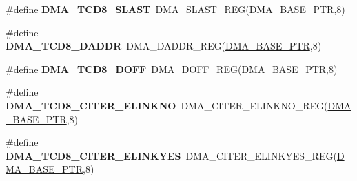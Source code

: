 \begin{DoxyCompactItemize}
\item 
\hypertarget{group___d_m_a___register___accessor___macros_ga3c48604678432613c2255a9ccf1ee23c}{}\#define {\bfseries D\+M\+A\+\_\+\+T\+C\+D8\+\_\+\+S\+L\+A\+S\+T}~D\+M\+A\+\_\+\+S\+L\+A\+S\+T\+\_\+\+R\+E\+G(\hyperlink{group___d_m_a___peripheral_ga6997fbc1b1973e9f27170217a3bd6f22}{D\+M\+A\+\_\+\+B\+A\+S\+E\+\_\+\+P\+T\+R},8)\label{group___d_m_a___register___accessor___macros_ga3c48604678432613c2255a9ccf1ee23c}

\item 
\hypertarget{group___d_m_a___register___accessor___macros_ga6585193ba70d793fa96c368446847218}{}\#define {\bfseries D\+M\+A\+\_\+\+T\+C\+D8\+\_\+\+D\+A\+D\+D\+R}~D\+M\+A\+\_\+\+D\+A\+D\+D\+R\+\_\+\+R\+E\+G(\hyperlink{group___d_m_a___peripheral_ga6997fbc1b1973e9f27170217a3bd6f22}{D\+M\+A\+\_\+\+B\+A\+S\+E\+\_\+\+P\+T\+R},8)\label{group___d_m_a___register___accessor___macros_ga6585193ba70d793fa96c368446847218}

\item 
\hypertarget{group___d_m_a___register___accessor___macros_ga87de01c15f745a0d3fb02b2b0b13764c}{}\#define {\bfseries D\+M\+A\+\_\+\+T\+C\+D8\+\_\+\+D\+O\+F\+F}~D\+M\+A\+\_\+\+D\+O\+F\+F\+\_\+\+R\+E\+G(\hyperlink{group___d_m_a___peripheral_ga6997fbc1b1973e9f27170217a3bd6f22}{D\+M\+A\+\_\+\+B\+A\+S\+E\+\_\+\+P\+T\+R},8)\label{group___d_m_a___register___accessor___macros_ga87de01c15f745a0d3fb02b2b0b13764c}

\item 
\hypertarget{group___d_m_a___register___accessor___macros_ga6da76173da694902dd5e5974ed7f9efd}{}\#define {\bfseries D\+M\+A\+\_\+\+T\+C\+D8\+\_\+\+C\+I\+T\+E\+R\+\_\+\+E\+L\+I\+N\+K\+N\+O}~D\+M\+A\+\_\+\+C\+I\+T\+E\+R\+\_\+\+E\+L\+I\+N\+K\+N\+O\+\_\+\+R\+E\+G(\hyperlink{group___d_m_a___peripheral_ga6997fbc1b1973e9f27170217a3bd6f22}{D\+M\+A\+\_\+\+B\+A\+S\+E\+\_\+\+P\+T\+R},8)\label{group___d_m_a___register___accessor___macros_ga6da76173da694902dd5e5974ed7f9efd}

\item 
\hypertarget{group___d_m_a___register___accessor___macros_gae6a4aaa8869815edf82c900a92bdfe92}{}\#define {\bfseries D\+M\+A\+\_\+\+T\+C\+D8\+\_\+\+C\+I\+T\+E\+R\+\_\+\+E\+L\+I\+N\+K\+Y\+E\+S}~D\+M\+A\+\_\+\+C\+I\+T\+E\+R\+\_\+\+E\+L\+I\+N\+K\+Y\+E\+S\+\_\+\+R\+E\+G(\hyperlink{group___d_m_a___peripheral_ga6997fbc1b1973e9f27170217a3bd6f22}{D\+M\+A\+\_\+\+B\+A\+S\+E\+\_\+\+P\+T\+R},8)\label{group___d_m_a___register___accessor___macros_gae6a4aaa8869815edf82c900a92bdfe92}


\end{DoxyCompactItemize}
